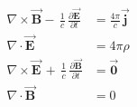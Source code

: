 $\begin{align} \nabla \times \vec{\mathbf{B}} -\, \frac1c\, \frac{\partial\vec{\mathbf{E}}}{\partial t} & = \frac{4\pi}{c}\vec{\mathbf{j}} \\  \nabla \cdot \vec{\mathbf{E}} & = 4 \pi \rho \\  \nabla \times \vec{\mathbf{E}}\, +\, \frac1c\, \frac{\partial\vec{\mathbf{B}}}{\partial t} & = \vec{\mathbf{0}} \\  \nabla \cdot \vec{\mathbf{B}} & = 0 \end{align}$